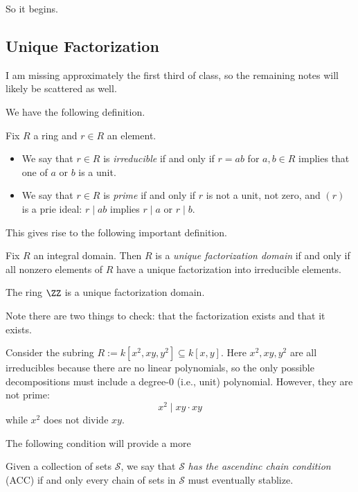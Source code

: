 







So it begins.

\subsection{Unique Factorization}
\begin{warn}
	I am missing approximately the first third of class, so the remaining notes will likely be scattered as well.
\end{warn}
We have the following definition.
\begin{definition}
	Fix $R$ a ring and $r\in R$ an element.
	\begin{itemize}
		\item We say that $r\in R$ is \textit{irreducible} if and only if $r=ab$ for $a,b\in R$ implies that one of $a$ or $b$ is a unit.
		\item We say that $r\in R$ is \textit{prime} if and only if $r$ is not a unit, not zero, and $(r)$ is a prie ideal: $r\mid ab$ implies $r\mid a$ or $r\mid b$.
	\end{itemize}
\end{definition}
This gives rise to the following important definition.
\begin{definition}
	Fix $R$ an integral domain. Then $R$ is a \textit{unique factorization domain} if and only if all nonzero elements of $R$ have a unique factorization into irreducible elements.
\end{definition}
\begin{example}
	The ring $\ZZ$ is a unique factorization domain.
\end{example}
Note there are two things to check: that the factorization exists and that it exists.
\begin{example}
	Consider the subring $R:=k\left[x^2,xy,y^2\right]\subseteq k[x,y]$. Here $x^2,xy,y^2$ are all irreducibles because there are no linear polynomials, so the only possible decompositions must include a degree-$0$ (i.e., unit) polynomial. However, they are not prime:
	\[x^2\mid xy\cdot xy\]
	while $x^2$ does not divide $xy$.
\end{example}
The following condition will provide a more 
\begin{definition}
	Given a collection of sets $\mathcal S$, we say that $\mathcal S$ \textit{has the ascendinc chain condition} (ACC) if and only every chain of sets in $\mathcal S$ must eventually stablize.
\end{definition}
